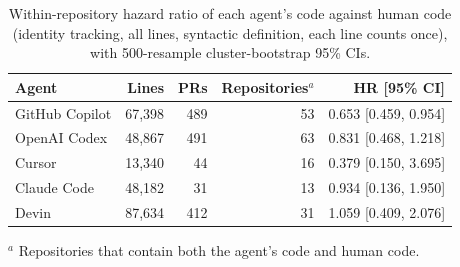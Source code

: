 
\begin{table}[t]
\centering
\caption{Within-repository hazard ratio of each agent's code against human code (identity tracking, all lines, syntactic definition, each line counts once), with 500-resample cluster-bootstrap 95\% CIs.}
\label{tab:rq3_per_agent}
\small
\begin{tabular}{lrrrr}
\toprule
\textbf{Agent} & \textbf{Lines} & \textbf{PRs} & \textbf{Repositories}$^{a}$ & \textbf{HR [95\% CI]} \\
\midrule
GitHub Copilot & 67,398 & 489 & 53 & 0.653 [0.459, 0.954] \\
OpenAI Codex & 48,867 & 491 & 63 & 0.831 [0.468, 1.218] \\
Cursor & 13,340 & 44 & 16 & 0.379 [0.150, 3.695] \\
Claude Code & 48,182 & 31 & 13 & 0.934 [0.136, 1.950] \\
Devin & 87,634 & 412 & 31 & 1.059 [0.409, 2.076] \\
\bottomrule
\end{tabular}
\par\smallskip\parbox{\linewidth}{\footnotesize $^{a}$ Repositories that contain both the agent's code and human code.}
\end{table}

